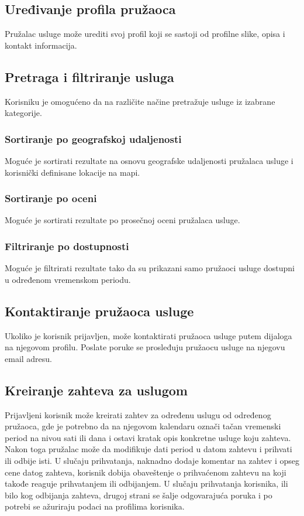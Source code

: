 \documentclass[a4paper,12pt]{report}
\begin{document}
\subsection{Uređivanje profila pružaoca}
Pružalac usluge može urediti svoj profil koji se sastoji od profilne slike, opisa i kontakt informacija.

\subsection{Pretraga i filtriranje usluga}
Korisniku je omogućeno da na različite načine pretražuje usluge iz izabrane kategorije.
\subsubsection{Sortiranje po geografskoj udaljenosti}
Moguće je sortirati rezultate na osnovu geografske udaljenosti pružalaca usluge i korisnički definisane lokacije na mapi.
\subsubsection{Sortiranje po oceni}
Moguće je sortirati rezultate po prosečnoj oceni pružalaca usluge.
\subsubsection{Filtriranje po dostupnosti}
Moguće je filtrirati rezultate tako da su prikazani samo pružaoci usluge dostupni u određenom vremenskom periodu.
\subsection{Kontaktiranje pružaoca usluge}
Ukoliko je korisnik prijavljen, može kontaktirati pružaoca usluge putem dijaloga na njegovom profilu. Poslate poruke se prosleđuju pružaocu usluge na njegovu email adresu.
\subsection{Kreiranje zahteva za uslugom}
Prijavljeni korisnik može kreirati zahtev za određenu uslugu od određenog pružaoca, gde je potrebno da na njegovom kalendaru označi tačan vremenski period na nivou sati ili dana i ostavi kratak opis konkretne usluge koju zahteva. Nakon toga pružalac može da modifikuje dati period u datom zahtevu i prihvati ili odbije isti. U slučaju prihvatanja, naknadno dodaje komentar na zahtev i opseg cene datog zahteva, korisnik dobija obaveštenje o prihvaćenom zahtevu na koji takođe reaguje prihvatanjem ili odbijanjem. U slučaju prihvatanja korisnika, ili bilo kog odbijanja zahteva, drugoj strani se šalje odgovarajuća poruka i po potrebi se ažuriraju podaci na profilima korisnika. 
\end{document}
